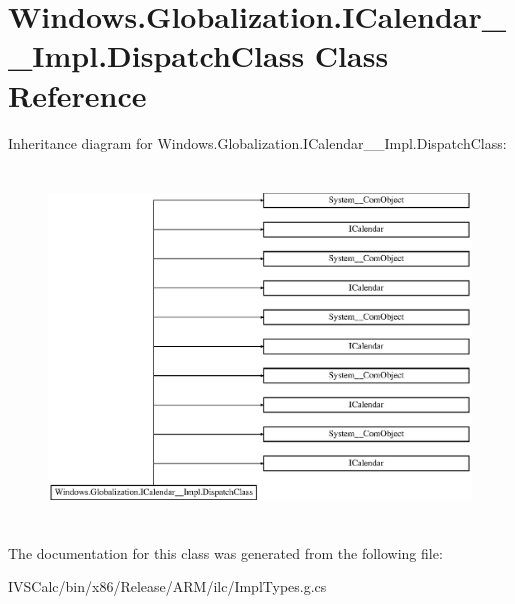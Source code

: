 \hypertarget{class_windows_1_1_globalization_1_1_i_calendar_____impl_1_1_dispatch_class}{}\section{Windows.\+Globalization.\+I\+Calendar\+\_\+\+\_\+\+Impl.\+Dispatch\+Class Class Reference}
\label{class_windows_1_1_globalization_1_1_i_calendar_____impl_1_1_dispatch_class}
Inheritance diagram for Windows.\+Globalization.\+I\+Calendar\+\_\+\+\_\+\+Impl.\+Dispatch\+Class\+:\begin{figure}[H]
\begin{center}
\leavevmode
\includegraphics[height=9.476923cm]{class_windows_1_1_globalization_1_1_i_calendar_____impl_1_1_dispatch_class}
\end{center}
\end{figure}


The documentation for this class was generated from the following file\+:\begin{DoxyCompactItemize}
\item 
I\+V\+S\+Calc/bin/x86/\+Release/\+A\+R\+M/ilc/Impl\+Types.\+g.\+cs\end{DoxyCompactItemize}

